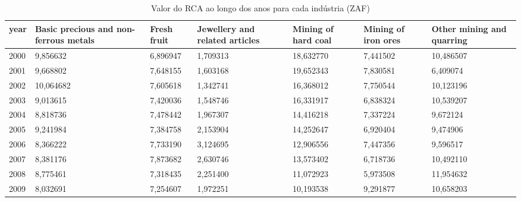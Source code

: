 \begin{table}
\centering
\caption{Valor do RCA ao longo dos anos para cada indústria (ZAF)}
\begin{tabular}{p{1cm}p{2cm}p{2cm}p{2cm}p{2cm}p{2cm}p{2cm}}
\toprule
 year &  Basic precious and non-ferrous metals &  Fresh fruit &  Jewellery and related articles &  Mining of hard coal &  Mining of iron ores &  Other mining and quarring \\
\midrule
 2000 &                               9,856632 &     6,896947 &                        1,709313 &            18,632770 &             7,441502 &                  10,486507 \\
 2001 &                               9,668802 &     7,648155 &                        1,603168 &            19,652343 &             7,830581 &                   6,409074 \\
 2002 &                              10,064682 &     7,605618 &                        1,342741 &            16,368012 &             7,750544 &                  10,123196 \\
 2003 &                               9,013615 &     7,420036 &                        1,548746 &            16,331917 &             6,838324 &                  10,539207 \\
 2004 &                               8,818736 &     7,478442 &                        1,967307 &            14,416218 &             7,337224 &                   9,672124 \\
 2005 &                               9,241984 &     7,384758 &                        2,153904 &            14,252647 &             6,920404 &                   9,474906 \\
 2006 &                               8,366222 &     7,733190 &                        3,124695 &            12,906556 &             7,447356 &                   9,596517 \\
 2007 &                               8,381176 &     7,873682 &                        2,630746 &            13,573402 &             6,718736 &                  10,492110 \\
 2008 &                               8,775461 &     7,318435 &                        2,251400 &            11,072923 &             5,973508 &                  11,954632 \\
 2009 &                               8,032691 &     7,254607 &                        1,972251 &            10,193538 &             9,291877 &                  10,658203 \\

\end{tabular}
\end{table}
